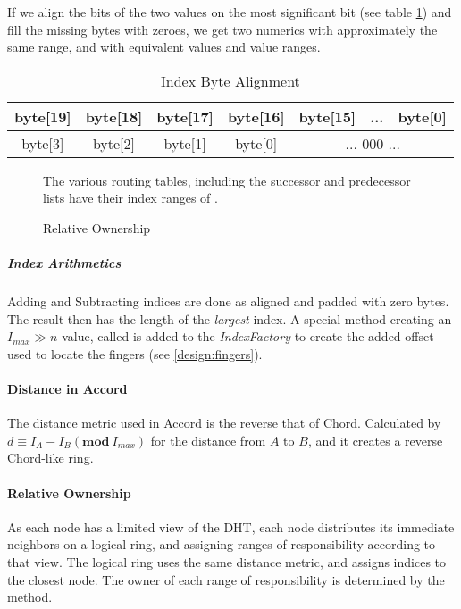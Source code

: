If we align the bits of the two values on the most significant bit (see table
 \ref{tab:byte-align}) and fill the missing bytes with zeroes, we get two numerics
 with approximately the same range, and with equivalent values and value ranges.

\begin{table}[htp]\begin{center}%
\begin{tabular}{|ccccccc|}                                                       \hline
byte[19] & byte[18] & byte[17] & byte[16] & byte[15] & ... & byte[0]          \\ \hline
byte[3]  & byte[2]  & byte[1]  & byte[0]  & \multicolumn{3}{|c|}{ ... 000 ...}\\ \hline
\end{tabular}\end{center}
\caption{Index Byte Alignment}
\label{tab:byte-align}
\end{table}

\begin{wrapfigure}{r}{.34\linewidth} %
\centering
{}
\parbox{.95\linewidth}{
\small
 The various routing tables, including the successor and predecessor lists have
 their index ranges of .
  }
\caption{Relative Ownership}
\label{fig:responsibility}
\end{wrapfigure}

\subparagraph{Index Arithmetics} Adding and Subtracting indices are done as aligned and
 padded with zero bytes. The result then has the length of the \emph{largest} index. A
 special method creating an $I_{max}\gg{}n$ value, called  is added
 to the {\em IndexFactory} to create the added offset used to locate the fingers (see
 \ref{design:fingers}).

\paragraph{Distance in Accord}
\label{design:responsibility}
The distance metric used in Accord is the reverse that of Chord. Calculated by
 $d \equiv I_A - I_B (\mathbf{mod}\ I_{max})$ for the distance from $A$ to $B$, and
  it creates a reverse Chord-like ring.

\paragraph{Relative Ownership}
As each node has a limited view of the DHT, each node distributes its immediate neighbors on
 a logical ring, and assigning ranges of responsibility according to that view. The
 logical ring uses the same distance metric, and assigns indices to the closest node.
 The owner of each range of responsibility is determined by the
  method.

